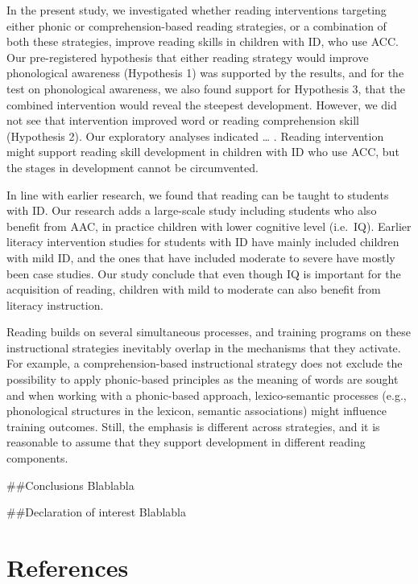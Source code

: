 \documentclass[
]{article}
\newlength{\cslhangindent}
\newlength{\cslentryspacingunit} %
\newenvironment{CSLReferences}[2] %
 {%
  \setlength{\parindent}{0pt}
  \ifodd #1
  \let\oldpar\par
  \def\par{\hangindent=\cslhangindent\oldpar}
  \fi
  \setlength{\parskip}{#2\cslentryspacingunit}
 }%
 {}
\begin{document}
In the present study, we investigated whether reading interventions
targeting either phonic or comprehension-based reading strategies, or a
combination of both these strategies, improve reading skills in children
with ID, who use ACC. Our pre-registered hypothesis that either reading
strategy would improve phonological awareness (Hypothesis 1) was
supported by the results, and for the test on phonological awareness, we
also found support for Hypothesis 3, that the combined intervention
would reveal the steepest development. However, we did not see that
intervention improved word or reading comprehension skill (Hypothesis
2). Our exploratory analyses indicated \ldots{} . Reading intervention
might support reading skill development in children with ID who use ACC,
but the stages in development cannot be circumvented.

In line with earlier research, we found that reading can be taught to
students with ID. Our research adds a large-scale study including
students who also benefit from AAC, in practice children with lower
cognitive level (i.e.~IQ). Earlier literacy intervention studies for
students with ID have mainly included children with mild ID, and the
ones that have included moderate to severe have mostly been case
studies. Our study conclude that even though IQ is important for the
acquisition of reading, children with mild to moderate can also benefit
from literacy instruction.

Reading builds on several simultaneous processes, and training programs
on these instructional strategies inevitably overlap in the mechanisms
that they activate. For example, a comprehension-based instructional
strategy does not exclude the possibility to apply phonic-based
principles as the meaning of words are sought and when working with a
phonic-based approach, lexico-semantic processes (e.g., phonological
structures in the lexicon, semantic associations) might influence
training outcomes. Still, the emphasis is different across strategies,
and it is reasonable to assume that they support development in
different reading components.

\#\#Conclusions Blablabla

\#\#Declaration of interest Blablabla

\newpage

\hypertarget{references}{%
\section{References}\label{references}}

\begingroup
\setlength{\parindent}{-0.5in}
\setlength{\leftskip}{0.5in}

\hypertarget{refs}{}
\begin{CSLReferences}{0}{0}
\end{CSLReferences}

\endgroup
\end{document}
